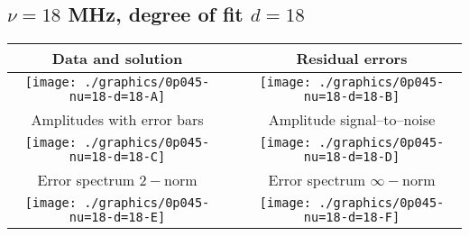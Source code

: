 

% 

\clearpage{}
\break{}

\subsection{$\nu = 18$ MHz, degree of fit $d = 18$}

\begin{table}[h]
    \begin{center}
        \begin{tabular}{ccc}
            Data and solution & \quad & Residual errors \\\hline
            \texttt{[image: ./graphics/0p045-nu=18-d=18-A]} &&
            \texttt{[image: ./graphics/0p045-nu=18-d=18-B]} \\[15pt]
            Amplitudes with error bars && Amplitude signal--to--noise \\\hline
            \texttt{[image: ./graphics/0p045-nu=18-d=18-C]} &&
            \texttt{[image: ./graphics/0p045-nu=18-d=18-D]} \\[15pt]
            Error spectrum $2-$norm && Error spectrum $\infty-$norm \\\hline
            \texttt{[image: ./graphics/0p045-nu=18-d=18-E]} &&
            \texttt{[image: ./graphics/0p045-nu=18-d=18-F]} \\[15pt]
        \end{tabular}
    \end{center}
\label{fig:elev=45, nu=18}
\end{table}



\endinput
